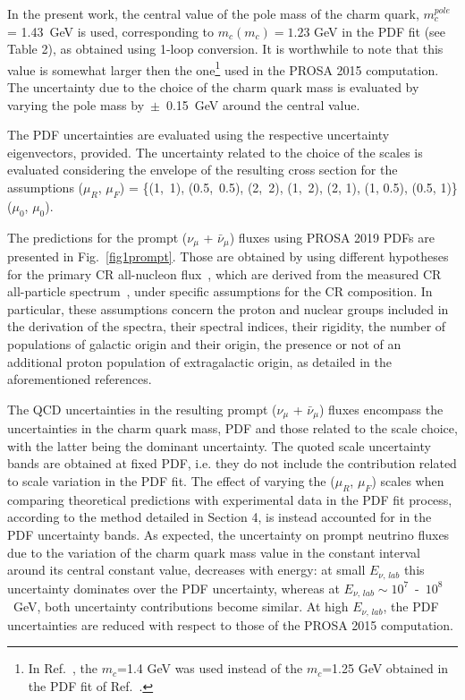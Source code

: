\documentclass[12pt]{article}
\begin{document}
In the present work, the central value of the pole mass of the charm quark, $m_c^{pole}$ = 1.43~GeV is used, corresponding to $m_c(m_c) = 1.23$ GeV in the PDF fit (see Table 2), as obtained using 1\nobreakdash-loop conversion. It is worthwhile to note that this value is somewhat larger then the one\footnote{In Ref.~\cite{Garzelli:2016xmx}, the $m_c$=1.4 GeV was used instead of the $m_c$=1.25 GeV obtained in the PDF fit of Ref.~\cite{Zenaiev:2015rfa}.} used in the PROSA 2015 computation.  
The uncertainty due to the choice of the charm quark mass is evaluated by varying the pole mass by~$\pm$~0.15~GeV around the central value.

The PDF uncertainties are evaluated using the respective uncertainty eigenvectors, provided. 
The uncertainty related to the choice of the scales is evaluated considering the envelope of the resulting cross section for the assumptions ($\mu_R$, $\mu_F$) = \{(1,~1), (0.5,~0.5), (2,~2), (1,~2), (2, 1), (1, 0.5), (0.5, 1)\} ($\mu_0$, $\mu_0$). 
  
The predictions for the prompt ($\nu_\mu$ + $\bar{\nu}_\mu$) fluxes using PROSA 2019 PDFs are presented in Fig.~\ref{fig1prompt}. Those are obtained by using different hypotheses for the primary CR all-nucleon flux~\cite{Gaisser:2011cc,Gaisser:2013bla}, which are derived from the measured CR all-particle spectrum~\cite{Kachelriess:2019oqu}, under specific assumptions for the CR composition. In particular, these assumptions concern the proton and nuclear groups included in the derivation of the spectra, their spectral indices, their rigidity, the number of populations of galactic origin and their origin, the presence or not of an additional proton population of extragalactic origin, as detailed in the aforementioned references.   

The QCD uncertainties in the resulting prompt ($\nu_\mu$ + $\bar{\nu}_\mu$) fluxes encompass the uncertainties in the charm quark mass, PDF and those related to the scale choice, with the latter being the dominant uncertainty. The quoted scale uncertainty bands are obtained at fixed PDF, i.e. they do not include the contribution related to scale variation in the PDF fit. The effect of varying the ($\mu_R$, $\mu_F$) scales when comparing theoretical predictions with experimental data in the PDF fit process, according to the method detailed in Section 4, is instead accounted for in the PDF uncertainty bands.  
As expected, the uncertainty on prompt neutrino fluxes due to the variation of the charm quark mass value in the constant interval around its central constant value, decreases with energy: at small $E_{\nu,\,lab}$ this uncertainty dominates over the PDF uncertainty, whereas at $E_{\nu,\,lab} \sim 10^7$~-~$10^8$~GeV, both uncertainty contributions become similar. 
At high $E_{\nu,\,lab}$, the PDF uncertainties are reduced with respect to those of the PROSA 2015 computation. 
\end{document}
